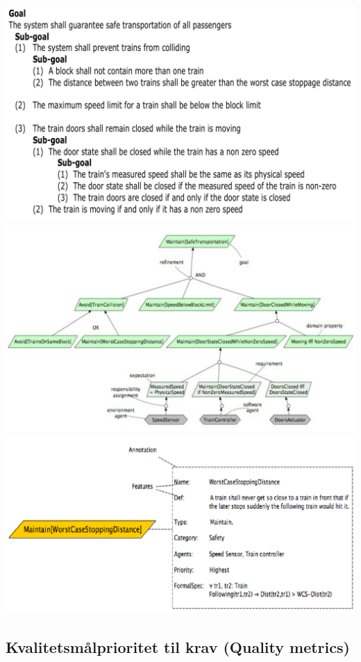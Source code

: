 \includegraphics{Forelesning 02/img/refinement-text.PNG}
\includegraphics{Forelesning 02/img/refinement-diagram.PNG}
\includegraphics{Forelesning 02/img/refinement-annotation.PNG}

\subsection{Kvalitetsmålprioritet til krav (Quality metrics)}

